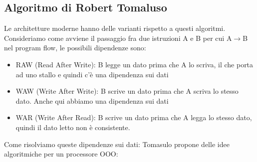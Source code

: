 \documentclass[12pt, oneside]{extbook}
\begin{document}
\subsection{Algoritmo di Robert Tomaluso}
Le architetture moderne hanno delle varianti rispetto a questi algoritmi. Consideriamo come avviene il passaggio fra due istruzioni A e B per cui A$\rightarrow$B nel program flow, le possibili dipendenze sono:
\begin{itemize}
\item RAW (Read After Write): B legge un dato prima che A lo scriva, il che porta ad uno stallo e quindi c'è una dipendenza sui dati
\item WAW (Write After Write): B scrive un dato prima che A scriva lo stesso dato. Anche qui abbiamo una dipendenza sui dati
\item WAR (Write After Read): B scrive un dato prima che A legga lo stesso dato, quindi il dato letto non è consistente.
\end{itemize}
Come risolviamo queste dipendenze sui dati: Tomasulo propone delle idee algoritmiche per un processore OOO:
\end{document}
